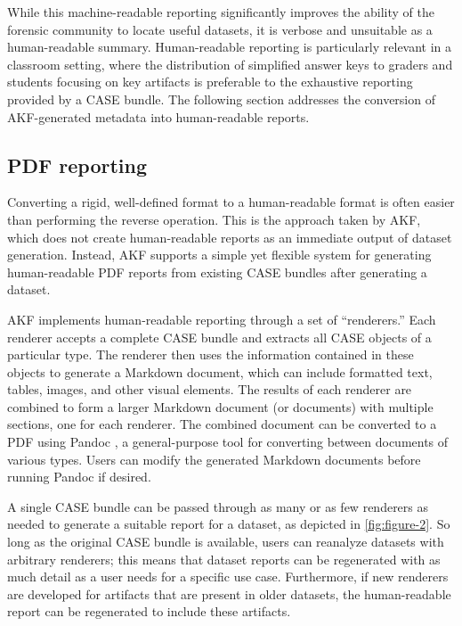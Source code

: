 While this machine-readable reporting significantly improves the ability
of the forensic community to locate useful datasets, it is verbose and
unsuitable as a human-readable summary. Human-readable reporting is
particularly relevant in a classroom setting, where the distribution of
simplified answer keys to graders and students focusing on key artifacts
is preferable to the exhaustive reporting provided by a CASE bundle. The
following section addresses the conversion of AKF-generated metadata
into human-readable reports.

\subsection{PDF reporting}\label{pdf-reporting}

Converting a rigid, well-defined format to a human-readable format is
often easier than performing the reverse operation. This is the approach
taken by AKF, which does not create human-readable reports as an
immediate output of dataset generation. Instead, AKF supports a simple
yet flexible system for generating human-readable PDF reports from
existing CASE bundles after generating a dataset.

AKF implements human-readable reporting through a set of ``renderers.''
Each renderer accepts a complete CASE bundle and extracts all CASE
objects of a particular type. The renderer then uses the information
contained in these objects to generate a Markdown document, which can
include formatted text, tables, images, and other visual elements. The
results of each renderer are combined to form a larger Markdown document
(or documents) with multiple sections, one for each renderer. The
combined document can be converted to a PDF using Pandoc
\citep{macfarlanePandoc2025}, a general-purpose tool for converting
between documents of various types. Users can modify the generated
Markdown documents before running Pandoc if desired.

A single CASE bundle can be passed through as many or as few renderers
as needed to generate a suitable report for a dataset, as depicted in
\autoref{fig:figure-2}. So long as the original CASE bundle is
available, users can reanalyze datasets with arbitrary renderers; this
means that dataset reports can be regenerated with as much detail as a
user needs for a specific use case. Furthermore, if new renderers are
developed for artifacts that are present in older datasets, the
human-readable report can be regenerated to include these artifacts.


